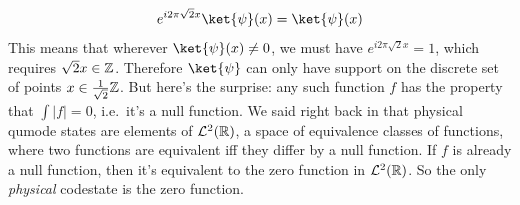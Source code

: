 \begin{example}
\begin{equation}
        e^{i 2\pi \sqrt{2} x} \ket{\psi}(x) = \ket{\psi}(x)
    \end{equation}
    This means that wherever $\ket{\psi}(x) \neq 0$, we must have $e^{i 2\pi \sqrt{2} x} = 1$, which requires $\sqrt{2} x \in \mathbb{Z}$.
    Therefore $\ket{\psi}$ can only have support on the discrete set of points $x \in \frac{1}{\sqrt{2}}\mathbb{Z}$.
    But here's the surprise: any such function $f$ has the property that $\int |f| = 0$, i.e.\ it's a null function.
    We said right back in  that physical qumode states are elements of $\mathcal{L}^2(\mathbb{R})$, a space of equivalence classes of functions, where two functions are equivalent iff they differ by a null function.
    If $f$ is already a null function, then it's equivalent to the zero function in $\mathcal{L}^2(\mathbb{R})$.
    So the only \textit{physical} codestate is the zero function.


\end{example}
